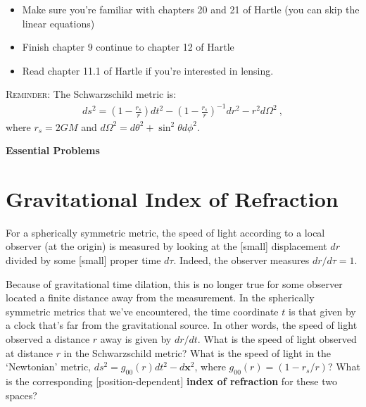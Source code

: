 \documentclass[12pt]{article}
\numberwithin{equation}{section}    %
\renewcommand{\vec}[1]{\mathbf{#1}} %
\begin{document}
\begin{itemize}
	\item Make sure you're familiar with chapters 20 and 21 of Hartle (you can skip the linear equations)
	\item Finish chapter 9 continue to chapter 12 of Hartle
	\item Read chapter 11.1 of Hartle if you're interested in lensing.
\end{itemize}

\vspace{2em}

\textsc{Reminder}: The Schwarzschild metric is:
\begin{align}
	ds^2 = \left(1-\frac{r_s}{r}\right) dt^2
	- \left(1-\frac{r_s}{r}\right)^{-1} dr^2
	- r^2 d\Omega^2 \ ,
\end{align}
where $r_s = 2GM$ and $d\Omega^2 = d\theta^2 + \sin^2\theta d\phi^2$.

\vspace{2em}
{\Large\textbf{\textsf{Essential Problems}}}

\section{Gravitational Index of Refraction}

For a spherically symmetric metric, the speed of light according to a local observer (at the origin) is measured by looking at the [small] displacement $dr$ divided by some [small] proper time $d\tau$. Indeed, the observer measures $dr/d\tau = 1$. 

Because of gravitational time dilation, this is no longer true for some observer located a finite distance away from the measurement. In the spherically symmetric metrics that we've encountered, the time coordinate $t$ is that given by a clock that's far from the gravitational source. In other words, the speed of light observed a distance $r$ away is given by $dr/dt$. What is the speed of light observed at distance $r$ in the Schwarzschild metric? What is the speed of light in the `Newtonian' metric, $ds^2 = g_{00}(r) dt^2 - d\vec x^2$, where $g_{00}(r) = (1-r_s/r)$? What is the corresponding [position-dependent] \textbf{index of refraction} for these two spaces? 
\end{document}

